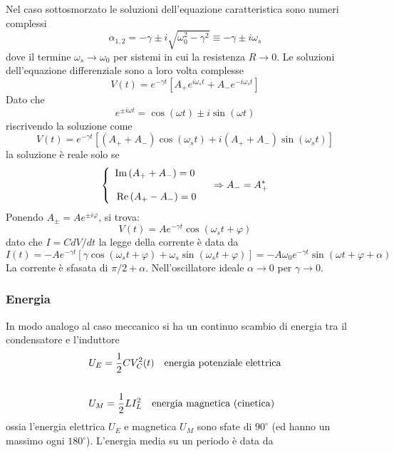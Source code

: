 Nel caso sottosmorzato le soluzioni dell'equazione caratteristica sono numeri complessi
\begin{equation*}
	\alpha_{1,2} = - \gamma \pm i \sqrt{\omega_0^2 - \gamma^2} \equiv - \gamma \pm i \omega_{s}
\end{equation*}
dove il termine $\omega_s \to \omega_0$ per sistemi in cui la resistenza $R \to 0$. Le soluzioni dell'equazione differenziale sono a loro volta complesse 
\begin{equation*}
	V(t) = e^{- \gamma t} [A_+ e^{i \omega_s t} + A_-e^{- i\omega_s t}]
\end{equation*}
Dato che 
\begin{equation*}
	e^{\pm i \omega t} = \cos(\omega t) \pm i \sin(\omega t)
\end{equation*}
riscrivendo la soluzione come 
\begin{equation*}
	V(t) = e^{-\gamma t}[(A_++A_-)\cos(\omega_st)+i(A_+ + A_-)\sin(\omega_s t)]
\end{equation*}
la soluzione \`e reale solo se 
\begin{equation*}
\left\{\begin{array}{l}
\operatorname{Im}\left(A_{+}+A_{-}\right)=0 \\ \rule{0pt}{20pt}
\operatorname{Re}\left(A_{+}-A_{-}\right)=0
\end{array} \quad \Rightarrow A_{-}=A_{+}^*\right.
\end{equation*}
Ponendo $A_{\pm} = A e^{\pm i \varphi}$, si trova:
\begin{equation*}
	V(t)= A e^{-\gamma t} \cos \left(\omega_s t+\varphi\right)
\end{equation*}
dato che $I = C  dV/dt$ la legge della corrente \`e data da
\begin{equation*}
	I(t) = -Ae^{- \gamma t} [\gamma \cos (\omega_s t + \varphi) +\omega_s \sin(\omega_s t + \varphi)] = -A \omega_0 e^{- \gamma t} \sin(\omega t + \varphi + \alpha)
\end{equation*}	
La corrente \`e sfasata di $\pi/2 + \alpha$. Nell'oscillatore ideale $\alpha \to 0 $ per $\gamma \to 0$.

\subsubsection{Energia}

In modo analogo al caso meccanico si ha un continuo scambio di energia tra il condensatore e l'induttore
\begin{align*}
& U_E =\frac{1}{2}C V_{C}^2(t) \quad \text{energia potenziale elettrica} \\ \rule{0pt}{30pt}
& U_M = \frac{1}{2}L I_{L}^2 \quad \text{energia magnetica (cinetica)}	
\end{align*} 
ossia l'energia elettrica $U_E$ e magnetica $U_M$ sono sfate di $90^{\circ}$ (ed hanno un massimo ogni $180^{\circ}$). L'energia media su un periodo \`e data da 

